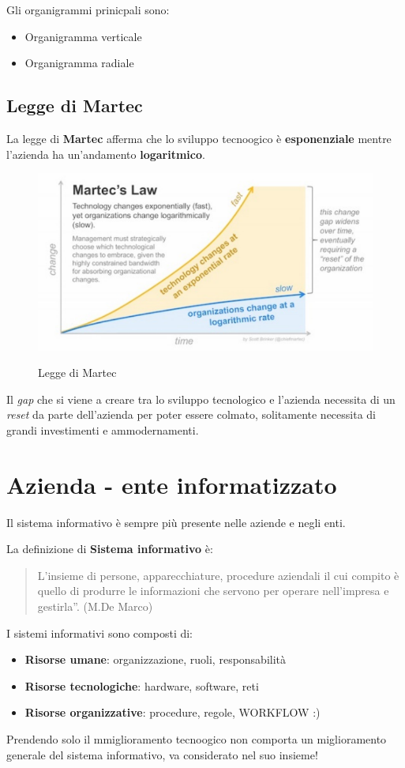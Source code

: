 Gli organigrammi prinicpali sono:
\begin{itemize}
  \item Organigramma verticale
  \item Organigramma radiale
\end{itemize}


\subsection{Legge di Martec}
La legge di \textbf{Martec} afferma che lo sviluppo tecnoogico \`e \textbf{esponenziale} 
mentre l'azienda ha un'andamento \textbf{logaritmico}.

\begin{figure}[!ht]
  \centering
  \includegraphics[width=0.7\linewidth]{images/martec.png}
  \label{fig:martec}
  \caption{Legge di Martec}
\end{figure}

Il \textit{gap} che si viene a creare tra lo sviluppo tecnologico e l'azienda necessita di un \textit{reset} da 
parte dell'azienda per poter essere colmato, solitamente necessita di grandi investimenti e ammodernamenti.

\section{Azienda - ente informatizzato}
Il sistema informativo è sempre più presente nelle aziende e negli enti.

La definizione di \textbf{Sistema informativo} è:
\begin{quote}
L’insieme di persone, apparecchiature, procedure aziendali il cui compito è quello
di produrre le informazioni che servono per operare nell’impresa e gestirla”.
(M.De Marco)
\end{quote}




I sistemi informativi sono composti di:
\begin{itemize}
  \item \textbf{Risorse umane}: organizzazione, ruoli, responsabilità
  \item \textbf{Risorse tecnologiche}: hardware, software, reti
  \item \textbf{Risorse organizzative}: procedure, regole, WORKFLOW :)
\end{itemize}

Prendendo solo il mmiglioramento tecnoogico non comporta un miglioramento generale
del sistema informativo, va considerato nel suo insieme!


